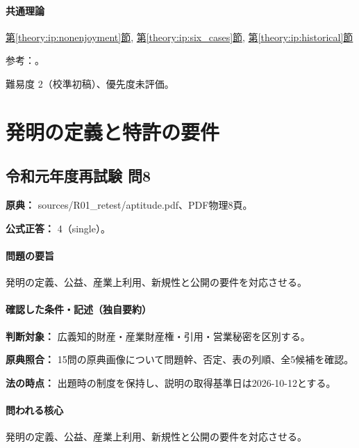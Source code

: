 \paragraph{共通理論} \hyperref[theory:ip:nonenjoyment]{第\ref*{theory:ip:nonenjoyment}節}, \hyperref[theory:ip:six_cases]{第\ref*{theory:ip:six_cases}節}, \hyperref[theory:ip:historical]{第\ref*{theory:ip:historical}節}

\par 参考：\cite{ip_flexible2019,bunka_amend2018,ip_copyright_statute}。

\par 難易度 2（校準初稿）、優先度未評価。

\section{発明の定義と特許の要件}

\subsection{令和元年度再試験 問8}
\label{q:r01-ret-apt-08}

\noindent\textbf{原典：} sources/R01\_retest/aptitude.pdf、PDF物理8頁。

\textbf{公式正答：} 4（single）。

\paragraph{問題の要旨} 発明の定義、公益、産業上利用、新規性と公開の要件を対応させる。

\paragraph{確認した条件・記述（独自要約）}\mbox{}\par

\noindent\textbf{判断対象：} 広義知的財産・産業財産権・引用・営業秘密を区別する。\par

\noindent\textbf{原典照合：} 15問の原典画像について問題幹、否定、表の列順、全5候補を確認。\par

\noindent\textbf{法の時点：} 出題時の制度を保持し、説明の取得基準日は2026-10-12とする。\par

\paragraph{問われる核心} 発明の定義、公益、産業上利用、新規性と公開の要件を対応させる。

